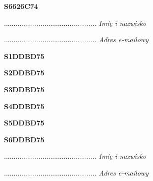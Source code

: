 \begin{turn}{90}\huge \textbf{S6626C74}\end{turn}

\begin{turn}{90}\begin{minipage}{\linewidth} \vspace{20mm} ................................................  \textit{Imię i nazwisko}\end{minipage}\end{turn}

\begin{turn}{90}\begin{minipage}{\linewidth} \vspace{20mm} ................................................  \textit{Adres e-mailowy}\end{minipage}\end{turn}

\begin{turn}{90}\huge \textbf{S1DDBD75}\end{turn}

\begin{turn}{90}\huge \textbf{S2DDBD75}\end{turn}

\begin{turn}{90}\huge \textbf{S3DDBD75}\end{turn}

\begin{turn}{90}\huge \textbf{S4DDBD75}\end{turn}

\begin{turn}{90}\huge \textbf{S5DDBD75}\end{turn}

\begin{turn}{90}\huge \textbf{S6DDBD75}\end{turn}

\begin{turn}{90}\begin{minipage}{\linewidth} \vspace{20mm} ................................................  \textit{Imię i nazwisko}\end{minipage}\end{turn}

\begin{turn}{90}\begin{minipage}{\linewidth} \vspace{20mm} ................................................  \textit{Adres e-mailowy}\end{minipage}\end{turn}

